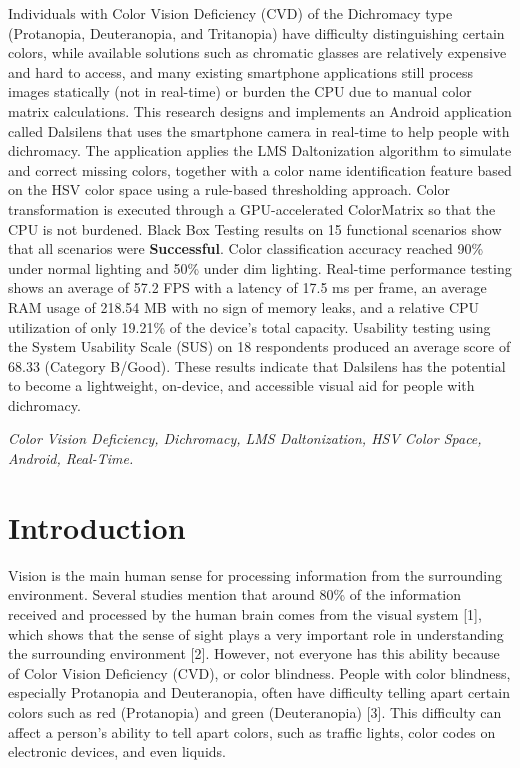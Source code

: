 \noindent\fontsize{10}{12}\selectfont
Individuals with Color Vision Deficiency (CVD) of the Dichromacy type (Protanopia, Deuteranopia, and Tritanopia) have difficulty distinguishing certain colors, while available solutions such as chromatic glasses are relatively expensive and hard to access, and many existing smartphone applications still process images statically (not in real-time) or burden the CPU due to manual color matrix calculations. This research designs and implements an Android application called Dalsilens that uses the smartphone camera in real-time to help people with dichromacy. The application applies the LMS Daltonization algorithm to simulate and correct missing colors, together with a color name identification feature based on the HSV color space using a rule-based thresholding approach. Color transformation is executed through a GPU-accelerated ColorMatrix so that the CPU is not burdened. Black Box Testing results on 15 functional scenarios show that all scenarios were \textbf{Successful}. Color classification accuracy reached 90\% under normal lighting and 50\% under dim lighting. Real-time performance testing shows an average of 57.2 FPS with a latency of 17.5 ms per frame, an average RAM usage of 218.54 MB with no sign of memory leaks, and a relative CPU utilization of only 19.21\% of the device's total capacity. Usability testing using the System Usability Scale (SUS) on 18 respondents produced an average score of 68.33 (Category B/Good). These results indicate that Dalsilens has the potential to become a lightweight, on-device, and accessible visual aid for people with dichromacy.

\vspace{0.6em}
 \textit{\fontsize{10}{12}\selectfont Color Vision Deficiency, Dichromacy, LMS Daltonization, HSV Color Space, Android, Real-Time.}

\vspace{1em}

\twocolumn

\section{Introduction}

Vision is the main human sense for processing information from the surrounding environment. Several studies mention that around 80\% of the information received and processed by the human brain comes from the visual system [1], which shows that the sense of sight plays a very important role in understanding the surrounding environment [2]. However, not everyone has this ability because of Color Vision Deficiency (CVD), or color blindness. People with color blindness, especially Protanopia and Deuteranopia, often have difficulty telling apart certain colors such as red (Protanopia) and green (Deuteranopia) [3]. This difficulty can affect a person's ability to tell apart colors, such as traffic lights, color codes on electronic devices, and even liquids.

